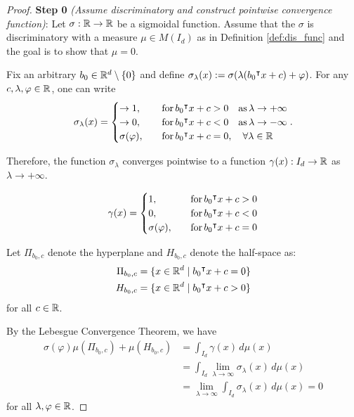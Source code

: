 \begin{proof}

    \textbf{Step 0} \textit{(Assume discriminatory and construct pointwise
    convergence function)}: Let $\sigma: \mathbb{R} \to \mathbb{R}$ be a sigmoidal function.
    Assume that the $\sigma$ is discriminatory with a measure $\mu \in M(I_d)$
    as in Definition \ref{def:dis_func} and the goal is to show that $\mu = 0$.

    Fix an arbitrary $b_0 \in \mathbb{R}^d\setminus \{0\}$ and define
    $\sigma_{\lambda}(x) := \sigma(\lambda (b_0{}^{\intercal} x + c) + \varphi)$. For
    any $c, \lambda, \varphi \in \mathbb{R}$, one can write
    \begin{equation}
        \sigma_{\lambda}(x)
        = \begin{cases}
            \to 1, \quad &\operatorname{for} b_0{}^{\intercal} x + c > 0 \quad \text{as}\, \lambda \to +\infty \\
            \to 0, \quad &\operatorname{for} b_0{}^{\intercal} x + c < 0 \quad \text{as}\, \lambda \to -\infty \\
            \sigma(\varphi), \quad &\operatorname{for} b_0{}^{\intercal} x + c = 0, \quad\forall \lambda \in \mathbb{R}
        \end{cases}.
    \end{equation}

    Therefore, the function $\sigma_{\lambda}$ converges pointwise to a function
    $\gamma(x): I_d \to \mathbb{R}$ as $\lambda \to + \infty$.

    \begin{equation}
        \gamma(x) = 
        \begin{cases}
            1,               \quad &\operatorname{for} b_0{}^{\intercal} x + c > 0 \\
            0,               \quad &\operatorname{for} b_0{}^{\intercal} x + c < 0 \\
            \sigma(\varphi), \quad &\operatorname{for} b_0{}^{\intercal} x + c = 0
        \end{cases}
    \end{equation}
    
    Let $\Pi_{b_0,c}$ denote the hyperplane and $H_{b_0, c}$ denote the
    half-space as: 
    \begin{align}
        \Pi_{b_0,c} &= \{x\in\mathbb{R}^d \mid b_0{}^{\intercal} x + c = 0\} \\
        H_{b_0, c}  &= \{x\in\mathbb{R}^d \mid b_0{}^{\intercal} x + c > 0\}
    \end{align}
    for all $c \in \mathbb{R}$.
    
    By the Lebesgue Convergence Theorem, we have
    \begin{align*}
        \sigma(\varphi) \mu(\Pi_{b_0, c}) + \mu (H_{b_0, c})
        &= \int_{I_d} \gamma(x) \,d\mu(x) \\
        &= \int_{I_d} \lim_{\lambda\to\infty} \sigma_{\lambda}(x)\,d\mu(x) \\
        &= \lim_{\lambda\to\infty} \int_{I_d} \sigma_{\lambda}(x)\,d\mu(x) = 0
    \end{align*}
    for all $\lambda, \varphi \in \mathbb{R}$.


\end{proof}
